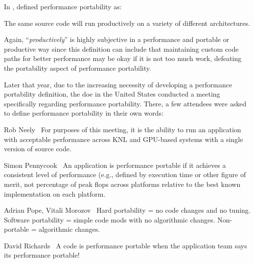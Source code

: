 In \citeyear{larkin_performance_2016}, \citet{larkin_performance_2016} defined performance portability as:
\begin{quotebox}{\citet{larkin_performance_2016}}
    The same source code will run productively on a variety of different architectures.
\end{quotebox}
Again, \enquote{\textit{productively}} is highly subjective in a performance and portable or productive way since this definition can include that maintaining custom code paths for better performance may be okay if it is not too much work, defeating the portability aspect of performance portability. 


Later that year, due to the increasing necessity of developing a performance portability definition, the \gls{doe} in the United States conducted a meeting~\cite{neely_doe_2016} specifically regarding performance portability. 
There, a few attendees were asked to define performance portability in their own words:
\begin{quotebox}{Rob Neely~\cite{neely_doe_2016}}
    For purposes of this meeting, it is the ability to run an application with acceptable performance across KNL and GPU-based systems with a single version of source code.
\end{quotebox}
\begin{quotebox}{Simon Pennycook~\cite{neely_doe_2016}}
    An application is performance portable if it achieves a consistent level of performance (e.g., defined by execution time or other figure of merit, not percentage of peak flops across platforms relative to the best known implementation on each platform.
\end{quotebox}
\begin{quotebox}{Adrian Pope, Vitali Morozov~\cite{neely_doe_2016}}
    Hard portability = no code changes and no tuning. Software portability = simple code mods with no algorithmic changes. Non-portable = algorithmic changes.
\end{quotebox}
\begin{quotebox}{David Richards~\cite{neely_doe_2016}}
    A code is performance portable when the application team says its performance portable!
\end{quotebox}

